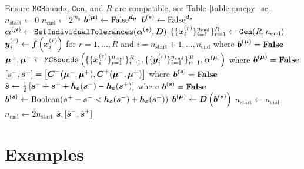 \documentclass{article}[12pt]
\begin{document}
\begin{algorithm}[h!]
\begin{algorithmic}
    \State Ensure $\texttt{MCBounds}$, $\texttt{Gen}$, and $R$ are compatible, see Table \ref{table:qmcpy_sc}
    \State $n_\text{start} \gets 0$
    \State $n_\text{end} \gets 2^{m_0}$
    \State $\boldsymbol{b}^{(\boldsymbol{\mu})} \gets \text{False}^{\boldsymbol{d}_{\boldsymbol{\mu}}}$
    \State $\boldsymbol{b}^{(\boldsymbol{s})} \gets \text{False}^{\boldsymbol{d}_{\boldsymbol{s}}}$
    \State $\boldsymbol{\alpha}^{(\boldsymbol{\mu})} \gets \texttt{SetIndividualTolerances}(\boldsymbol{\alpha}^{(\boldsymbol{s})},\boldsymbol{D})$ 
        \State $\{\{\boldsymbol{x}_i^{(r)}\}_{i=1}^{n_\text{end}}\}_{r=1}^R \gets \texttt{Gen}(R,n_\text{end})$ \\ 
        \State $\boldsymbol{y}_i^{(r)} \gets \boldsymbol{f}\left(\boldsymbol{x}_i^{(r)}\right)$ for $r=1,\dots,R$ and $i=n_\text{start}+1,\dots,n_\text{end}$ where $\boldsymbol{b}^{(\boldsymbol{\mu})}=\textbf{\text{False}}$ \\ 
        \State $\boldsymbol{\mu}^+,\boldsymbol{\mu}^- \gets \texttt{MCBounds}\left(\{\{\boldsymbol{x}_i^{(r)}\}_{i=1}^{n_\text{end}}\}_{r=1}^R, \{\{\boldsymbol{y}_i^{(r)}\}_{i=1}^{n_\text{end}}\}_{r=1}^R,\boldsymbol{\alpha}^{(\boldsymbol{\mu})}\right)$ where $\boldsymbol{b}^{(\boldsymbol{\mu})}=\textbf{\text{False}}$ \\ 
        \State $[\boldsymbol{s}^-,\boldsymbol{s}^+] = \left[\boldsymbol{C}^-(\boldsymbol{\mu}^-,\boldsymbol{\mu}^+),\boldsymbol{C}^+(\boldsymbol{\mu}^-,\boldsymbol{\mu}^+)\right]$ where $\boldsymbol{b}^{(\boldsymbol{s})} = \textbf{\text{False}}$
        \State $\hat{\boldsymbol{s}} \gets \frac{1}{2}\left[\boldsymbol{s}^-+\boldsymbol{s}^++\boldsymbol{h}_{\boldsymbol{\varepsilon}}(\boldsymbol{s}^-)-\boldsymbol{h}_{\boldsymbol{\varepsilon}}(\boldsymbol{s}^+)\right]$ where $\boldsymbol{b}^{(\boldsymbol{s})} = \textbf{\text{False}}$
        \State $\boldsymbol{b}^{(\boldsymbol{s})} \gets \text{Boolean}(\boldsymbol{s}^+-\boldsymbol{s}^- < \boldsymbol{h}_{\boldsymbol{\varepsilon}}(\boldsymbol{s}^-)+\boldsymbol{h}_{\boldsymbol{\varepsilon}}(\boldsymbol{s}^+))$
        \State $\boldsymbol{b}^{(\boldsymbol{\mu})} \gets \boldsymbol{D}\left(\boldsymbol{b}^{(\boldsymbol{s})}\right)$
        \State $n_\text{start} \gets n_\text{end}$
        \State $n_\text{end} \gets 2n_\text{start}$
    \EndWhile
    \State \Return $\hat{\boldsymbol{s}},[\hat{\boldsymbol{s}}^-,\hat{\boldsymbol{s}}^+]$
    \end{algorithmic}
\end{algorithm}

\section{Examples}
\end{document}

